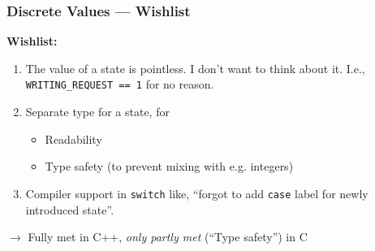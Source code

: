 \begin{frame}
  \frametitle{Discrete Values --- Wishlist}

  \textbf{Wishlist:}

  \begin {enumerate}
  \item The value of a state is pointless. I don't want to think about
    it. I.e., \texttt{WRITING\_REQUEST == 1} for no reason.
  \item Separate type for a state, for
    \begin {itemize}
    \item Readability
    \item Type safety (to prevent mixing with e.g. integers)
    \end {itemize}
  \item Compiler support in \texttt{switch} like, ``forgot to add
    \texttt{case} label for newly introduced state''.
  \end {enumerate}

  $\to$ Fully met in C++, \textit{only partly met} (``Type safety'')
  in C

\end{frame}

